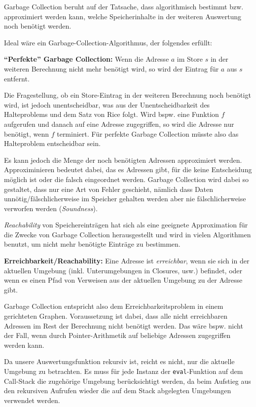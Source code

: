 \documentclass[]{article}
\begin{document}
Garbage Collection beruht auf der Tatsache, dass algorithmisch bestimmt
bzw. approximiert werden kann, welche Speicherinhalte in der weiteren
Auswertung noch benötigt werden.

Ideal wäre ein Garbage-Collection-Algorithmus, der folgendes erfüllt:

\textbf{``Perfekte'' Garbage Collection:} Wenn die Adresse \(a\) im
Store \(s\) in der weiteren Berechnung nicht mehr benötigt wird, so wird
der Eintrag für \(a\) aus \(s\) entfernt.

Die Fragestellung, ob ein Store-Eintrag in der weiteren Berechnung noch
benötigt wird, ist jedoch unentscheidbar, was aus der Unentscheidbarkeit
des Halteproblems und dem Satz von Rice folgt. Wird bspw. eine Funktion
\(f\) aufgerufen und danach auf eine Adresse zugegriffen, so wird die
Adresse nur benötigt, wenn \(f\) terminiert. Für perfekte Garbage
Collection müsste also das Halteproblem entscheidbar sein.

Es kann jedoch die Menge der noch benötigten Adressen approximiert
werden. Approximinieren bedeutet dabei, das es Adressen gibt, für die
keine Entscheidung möglich ist oder die falsch eingeordnet werden.
Garbage Collection wird dabei so gestaltet, dass nur eine Art von Fehler
geschieht, nämlich dass Daten unnötig/fälschlicherweise im Speicher
gehalten werden aber nie fälschlicherweise verworfen werden
(\emph{Soundness}).

\emph{Reachability} von Speichereinträgen hat sich als eine geeignete
Approximation für die Zwecke von Garbage Collection herausgestellt und
wird in vielen Algorithmen benutzt, um nicht mehr benötigte Einträge zu
bestimmen.

\textbf{Erreichbarkeit/Reachability:} Eine Adresse ist
\emph{erreichbar}, wenn sie sich in der aktuellen Umgebung (inkl.
Unterumgebungen in Closures, usw.) befindet, oder wenn es einen Pfad von
Verweisen aus der aktuellen Umgebung zu der Adresse gibt.

Garbage Collection entspricht also dem Erreichbarkeitsproblem in einem
gerichteten Graphen. Voraussetzung ist dabei, dass alle nicht
erreichbaren Adressen im Rest der Berechnung nicht benötigt werden. Das
wäre bspw. nicht der Fall, wenn durch Pointer-Arithmetik auf beliebige
Adressen zugegriffen werden kann.

Da unsere Auswertungsfunktion rekursiv ist, reicht es nicht, nur die
aktuelle Umgebung zu betrachten. Es muss für jede Instanz der
\texttt{eval}-Funktion auf dem Call-Stack die zugehörige Umgebung
berücksichtigt werden, da beim Aufstieg aus den rekursiven Aufrufen
wieder die auf dem Stack abgelegten Umgebungen verwendet werden.
\end{document}
